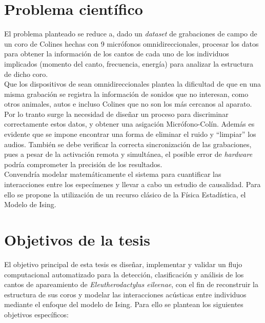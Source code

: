 \section{Problema científico}

El problema planteado se reduce a, dado un \emph{dataset} de grabaciones
de campo de un coro de Colines hechas con 9 micrófonos omnidireccionales,
procesar los datos para obtener la información de los cantos de cada uno de 
los individuos implicados (momento del canto, frecuencia, energía) para
analizar la estructura de dicho coro. \\

Que los dispositivos de sean omnidireccionales plantea la dificultad de
que en una misma grabación se registra la información de sonidos que no interesan,
como otros animales, autos e incluso Colines que no son los más cercanos al aparato.
Por lo tranto surge la necesidad de diseñar un proceso para discriminar correctamente
estos datos, y obtener una asigación Micrófono-Colín. Además es evidente que se impone
encontrar una forma de eliminar el ruido y “limpiar” los audios. 
También se debe verificar la correcta sincronización de las grabaciones,
pues a pesar de la activación remota y simultánea, el posible error de \emph{hardware}
podría comprometer la precisión de los resultados.\\

Convendría modelar matemáticamente el sistema
para cuantificar las interacciones entre los especímenes y llevar a cabo un estudio
de causalidad. Para ello se propone la utilización de un recurso clásico
de la Física Estadística, el Modelo de Ising. \cite{chau2017inverse}

\section{Objetivos de la tesis}

El objetivo principal de esta tesis es diseñar, implementar y validar un flujo computacional automatizado para la detección, clasificación y análisis de los cantos de apareamiento de \emph{Eleutherodactylus eileenae}, con el fin de reconstruir la estructura de sus coros y modelar las interacciones acústicas entre individuos mediante el enfoque del modelo de Ising.
Para ello se plantean los siguientes objetivos específicos:

